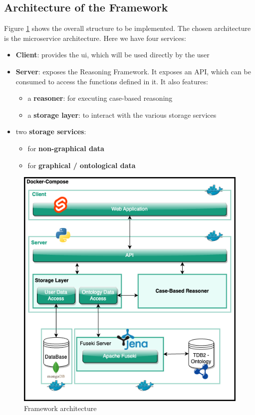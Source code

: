 \subsection{Architecture of the Framework \label{subsec:archi-frame}}
Figure \ref{fig:frame-archi} shows the overall structure to be implemented. The chosen architecture is the microservice architecture. Here we have four services:
\begin{itemize}
    \item \textbf{Client}: provides the \acrfull{ui}, which will be used directly by the user
    \item \textbf{Server}: exposes the Reasoning Framework. It exposes an API, which can be consumed to access the functions defined in it. It also features:
        \begin{itemize}
            \item a \textbf{reasoner}: for executing case-based reasoning
            \item a \textbf{storage layer}: to interact with the various storage services
        \end{itemize}
    
    \item two \textbf{storage services}: 
        \begin{itemize}
            \item for \textbf{non-graphical data}
            \item for \textbf{graphical / ontological data}
        \end{itemize}
\end{itemize}


\begin{figure}[h]
\centering
\includegraphics[scale=0.6]{images/SemanticAssistant-Detailled Architecture.drawio.png}
\caption{\label{fig:frame-archi}  Framework architecture}
\end{figure}



